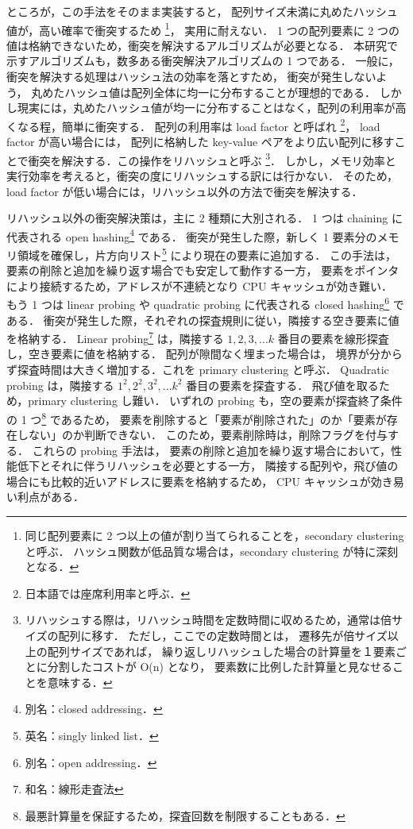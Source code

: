 ところが，この手法をそのまま実装すると，
配列サイズ未満に丸めたハッシュ値が，高い確率で衝突するため
\footnote{
同じ配列要素に 2 つ以上の値が割り当てられることを，secondary clustering と呼ぶ．
ハッシュ関数が低品質な場合は，secondary clustering が特に深刻となる．
}，
実用に耐えない．
1 つの配列要素に 2 つの値は格納できないため，衝突を解決するアルゴリズムが必要となる．
本研究で示すアルゴリズムも，数多ある衝突解決アルゴリズムの 1 つである．
一般に，
衝突を解決する処理はハッシュ法の効率を落とすため，
衝突が発生しないよう，
丸めたハッシュ値は配列全体に均一に分布することが理想的である．
しかし現実には，丸めたハッシュ値が均一に分布することはなく，配列の利用率が高くなる程，簡単に衝突する．
配列の利用率は load factor と呼ばれ
\footnote{
日本語では座席利用率と呼ぶ．
}，
load factor が高い場合には，
配列に格納した key-value ペアをより広い配列に移すことで衝突を解決する．この操作をリハッシュと呼ぶ
\footnote{
リハッシュする際は，リハッシュ時間を定数時間に収めるため，通常は倍サイズの配列に移す．
ただし，ここでの定数時間とは，
遷移先が倍サイズ以上の配列サイズであれば，
繰り返しリハッシュした場合の計算量を１要素ごとに分割したコストが O(n) となり，
要素数に比例した計算量と見なせることを意味する．
}．
しかし，メモリ効率と実行効率を考えると，衝突の度にリハッシュする訳には行かない．
そのため，load factor が低い場合には，リハッシュ以外の方法で衝突を解決する．

リハッシュ以外の衝突解決策は，主に 2 種類に大別される．
1 つは chaining に代表される open hashing\footnote{別名：closed addressing．} である．
衝突が発生した際，新しく 1 要素分のメモリ領域を確保し，片方向リスト\footnote{英名：singly linked list．} により現在の要素に追加する．
この手法は，
要素の削除と追加を繰り返す場合でも安定して動作する一方，
要素をポインタにより接続するため，アドレスが不連続となり CPU キャッシュが効き難い．
もう 1 つは linear probing や quadratic probing に代表される closed hashing\footnote{別名：open addressing．} である．
衝突が発生した際，それぞれの探査規則に従い，隣接する空き要素に値を格納する．
Linear probing\footnote{和名：線形走査法} は，隣接する $1, 2, 3, ... k$ 番目の要素を線形探査し，空き要素に値を格納する．
配列が隙間なく埋まった場合は，
境界が分からず探査時間は大きく増加する．これを primary clustering と呼ぶ．
Quadratic probing は，隣接する $1^2, 2^2, 3^2, ... k^2$ 番目の要素を探査する．
飛び値を取るため，primary clustering し難い．
いずれの probing も，空の要素が探査終了条件の 1 つ\footnote{最悪計算量を保証するため，探査回数を制限することもある．} であるため，
要素を削除すると「要素が削除された」のか「要素が存在しない」のか判断できない．
このため，要素削除時は，削除フラグを付与する．
これらの probing 手法は，
要素の削除と追加を繰り返す場合において，性能低下とそれに伴うリハッシュを必要とする一方，
隣接する配列や，飛び値の場合にも比較的近いアドレスに要素を格納するため，
CPU キャッシュが効き易い利点がある．

